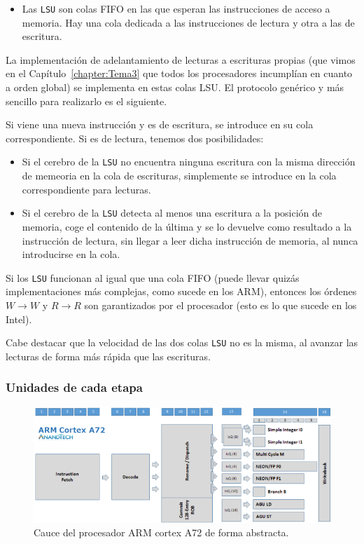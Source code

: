\begin{itemize}
\begin{itemize}
            \item Las \verb|LSU| son colas FIFO en las que esperan las instrucciones de acceso a memoria. Hay una cola dedicada a las instrucciones de lectura y otra a las de escritura. 
        \end{itemize}
    La implementación de adelantamiento de lecturas a escrituras propias (que vimos en el Capítulo~\ref{chapter:Tema3} que todos los procesadores incumplían en cuanto a orden global) se implementa en estas colas LSU\@. El protocolo genérico y más sencillo para realizarlo es el siguiente.

    Si viene una nueva instrucción y es de escritura, se introduce en su cola correspondiente. Si es de lectura, tenemos dos posibilidades:
    \begin{itemize}
        \item Si el cerebro de la \verb|LSU| no encuentra ninguna escritura con la misma dirección de memeoria en la cola de escrituras, simplemente se introduce en la cola correspondiente para lecturas.
        \item Si el cerebro de la \verb|LSU| detecta al menos una escritura a la posición de memoria, coge el contenido de la última y se lo devuelve como resultado a la instrucción de lectura, sin llegar a leer dicha instrucción de memoria, al nunca introducirse en la cola.
    \end{itemize}
    Si los \verb|LSU| funcionan al igual que una cola FIFO (puede llevar quizás implementaciones más complejas, como sucede en los ARM), entonces los órdenes $W\rightarrow W$ y $R\rightarrow R$ son garantizados por el procesador (esto es lo que sucede en los Intel).

    Cabe destacar que la velocidad de las dos colas \verb|LSU| no es la misma, al avanzar las lecturas de forma más rápida que las escrituras.
\end{itemize}

\subsubsection{Unidades de cada etapa}

\begin{figure}
    \centering
    \includegraphics[width=0.8\linewidth]{Images/Cauce2.png}
    \caption{Cauce del procesador ARM cortex A72 de forma abstracta.}
    \label{fig:Cauce_ARM_cortex_a72}
\end{figure}

